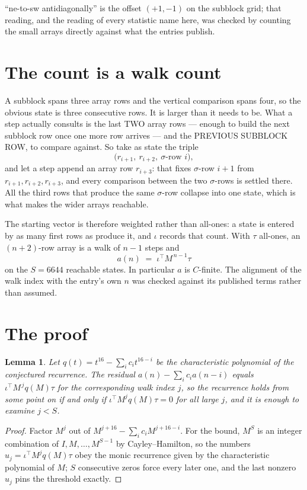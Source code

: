 \documentclass[11pt,a4paper]{article}
\theoremstyle{plain}
\newtheorem{lemma}[theorem]{Lemma}
\theoremstyle{definition}
\begin{document}
``ne-to-sw antidiagonally'' is the offset $(+1,-1)$ on the subblock grid; that reading, and
the reading of every statistic name here, was checked by counting the small arrays directly
against what the entries publish.

\section{The count is a walk count}

A subblock spans three array rows and the vertical comparison spans four, so the obvious state
is three consecutive rows. It is larger than it needs to be. What a step actually consults is
the last TWO array rows --- enough to build the next subblock row once one more row arrives ---
and the PREVIOUS SUBBLOCK ROW, to compare against. So take as state the triple
\[
\bigl(r_{i+1},\ r_{i+2},\ \sigma\text{-row }i\bigr),
\]
and let a step append an array row $r_{i+3}$: that fixes $\sigma$-row $i+1$ from
$r_{i+1},r_{i+2},r_{i+3}$, and every comparison between the two $\sigma$-rows is settled
there. All the third rows that produce the same $\sigma$-row collapse into one state, which is
what makes the wider arrays reachable.

The starting vector is therefore weighted rather than all-ones: a state is entered by as many
first rows as produce it, and $\iota$ records that count. With $\tau$ all-ones, an
$(n+2)$-row array is a walk of $n-1$ steps and
\[
a(n)\;=\;\iota^{\!\top}M^{\,n-1}\tau
\]
on the $S=6644$ reachable states. In particular $a$ is $C$-finite. The alignment of the walk
index with the entry's own $n$ was checked against its published terms rather than assumed.

\section{The proof}

\begin{lemma}\label{lem:crit}
Let $q(t)=t^{16}-\sum_i c_it^{16-i}$ be the characteristic polynomial of the
conjectured recurrence. The residual $a(n)-\sum_ic_ia(n-i)$ equals
$\iota^{\!\top}M^{\,j}q(M)\tau$ for the corresponding walk index $j$, so the recurrence
holds from some point on if and only if $\iota^{\!\top}M^{j}q(M)\tau=0$ for all large $j$,
and it is enough to examine $j<S$.
\end{lemma}

\begin{proof}
Factor $M^{j}$ out of $M^{j+16}-\sum_ic_iM^{j+16-i}$. For the bound, $M^{S}$
is an integer combination of $I,M,\dots,M^{S-1}$ by Cayley--Hamilton, so the numbers
$u_j=\iota^{\!\top}M^{j}q(M)\tau$ obey the monic recurrence given by the characteristic
polynomial of $M$; $S$ consecutive zeros force every later one, and the last nonzero $u_j$
pins the threshold exactly.
\end{proof}
\end{document}
